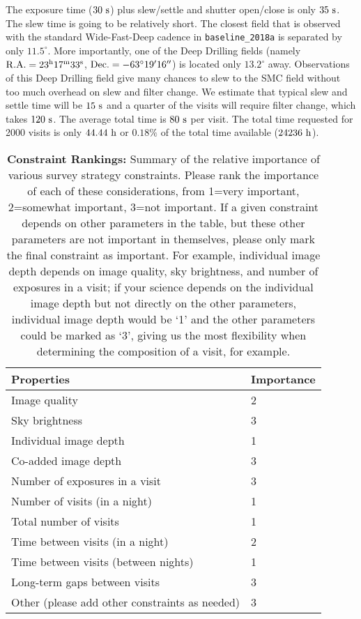 \documentclass[12pt,letterpaper]{article}
\begin{document}
The exposure time ($30~{\rm s}$) plus slew/settle and shutter open/close is only 
$35~{\rm s}$.  The slew time is going to be relatively short.  The closest field 
that is observed with the standard Wide-Fast-Deep cadence in {\tt baseline\_2018a} 
is separated by only $11.5^{\circ}$.  
More importantly, one of the Deep Drilling fields (namely 
${\rm R.A.} = 23^{\rm h}17^{\rm m}33^{\rm s}$, 
${\rm Dec.} = -63^{\circ}19'16''$) is located only $13.2^{\circ}$ away.  
Observations of this Deep Drilling field give many chances to slew to 
the SMC field without too much overhead on slew and filter change.  
We estimate that typical slew and settle time will be $15~{\rm s}$ 
and a quarter of the visits will require filter change, which takes $120~{\rm s}$.  
The average total time is $80~{\rm s}$ per visit.  
The total time requested for 2000 visits is only $44.44~{\rm h}$ or 
$0.18\%$ of the total time available ($24236~{\rm h}$).  

\begin{table}[ht]
    \centering
    \begin{tabular}{l|l}
        \toprule
        Properties & Importance \hspace{.3in} \\
        \midrule
        Image quality &  2 \\
        Sky brightness &  3 \\
        Individual image depth & 1  \\
        Co-added image depth &  3 \\
        Number of exposures in a visit   &  3 \\
        Number of visits (in a night)  &  1 \\ 
        Total number of visits &  1 \\
        Time between visits (in a night) & 2 \\
        Time between visits (between nights)  &  1 \\
        Long-term gaps between visits & 3 \\
        Other (please add other constraints as needed) & 3 \\
        \bottomrule
    \end{tabular}
     \caption{{\bf Constraint Rankings:} Summary of the relative importance of various survey strategy constraints. Please rank the importance of each of these considerations, from 1=very important, 2=somewhat important, 3=not important. If a given constraint depends on other parameters in the table, but these other parameters are not important in themselves, please only mark the final constraint as important. For example, individual image depth depends on image quality, sky brightness, and number of exposures in a visit; if your science depends on the individual image depth but not directly on the other parameters, individual image depth would be `1' and the other parameters could be marked as `3', giving us the most flexibility when determining the composition of a visit, for example.}
         \label{tab:obs_constraints}
\end{table}
\end{document}
